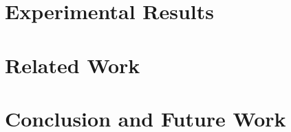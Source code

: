 \documentclass[twocolumn]{svjour3}          %
\begin{document}
\section{Experimental Results} \label{sec:results}


\section{Related Work}\label{sec:bgrel}


\section{Conclusion and Future Work} \label{sec:concl}



\end{document}
